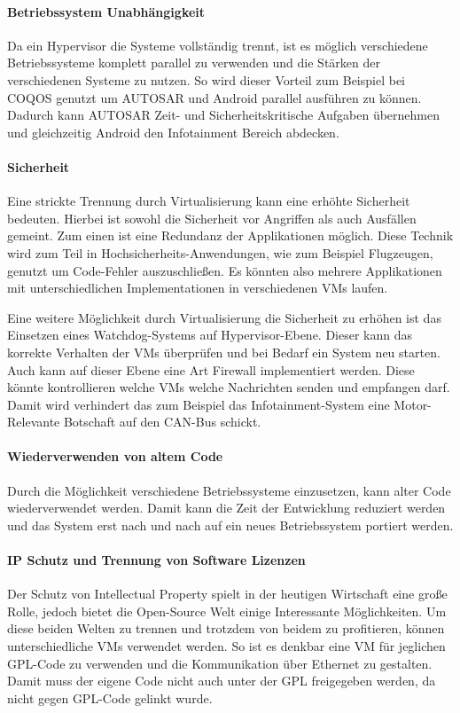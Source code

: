 \documentclass[
  a4paper,					    %
  twoside,
  DIV=calc,     				%
  bibliography=totoc,
  cleardoublepage=empty,
  ngerman,     					%
  final       					%
]{scrbook}
\begin{document}
\paragraph{Betriebssystem Unabhängigkeit}
Da ein Hypervisor die Systeme vollständig trennt, ist es möglich verschiedene Betriebssysteme komplett parallel zu verwenden und die Stärken der verschiedenen Systeme zu nutzen. So wird dieser Vorteil zum Beispiel bei COQOS genutzt um AUTOSAR und Android parallel ausführen zu können. Dadurch kann AUTOSAR Zeit- und Sicherheitskritische Aufgaben übernehmen und gleichzeitig Android den Infotainment Bereich abdecken.

\paragraph{Sicherheit}
Eine strickte Trennung durch Virtualisierung kann eine erhöhte Sicherheit bedeuten. Hierbei ist sowohl die Sicherheit vor Angriffen als auch Ausfällen gemeint. Zum einen ist eine Redundanz der Applikationen möglich. Diese Technik wird zum Teil in Hochsicherheits-Anwendungen, wie zum Beispiel Flugzeugen, genutzt um Code-Fehler auszuschließen. Es könnten also mehrere Applikationen mit unterschiedlichen Implementationen in verschiedenen VMs laufen.

Eine weitere Möglichkeit durch Virtualisierung die Sicherheit zu erhöhen ist das Einsetzen eines Watchdog-Systems auf Hypervisor-Ebene. Dieser kann das korrekte Verhalten der VMs überprüfen und bei Bedarf ein System neu starten. Auch kann auf dieser Ebene eine Art Firewall implementiert werden. Diese könnte kontrollieren welche VMs welche Nachrichten senden und empfangen darf. Damit wird verhindert das zum Beispiel das Infotainment-System eine Motor-Relevante Botschaft auf den CAN-Bus schickt.

\paragraph{Wiederverwenden von altem Code}
Durch die Möglichkeit verschiedene Betriebssysteme einzusetzen, kann alter Code wiederverwendet werden. Damit kann die Zeit der Entwicklung reduziert werden und das System erst nach und nach auf ein neues Betriebssystem portiert werden.

\paragraph{IP Schutz und Trennung von Software Lizenzen}
Der Schutz von Intellectual Property spielt in der heutigen Wirtschaft eine große Rolle, jedoch bietet die Open-Source Welt einige Interessante Möglichkeiten. Um diese beiden Welten zu trennen und trotzdem von beidem zu profitieren, können unterschiedliche VMs verwendet werden. So ist es denkbar eine VM für jeglichen GPL-Code zu verwenden und die Kommunikation über Ethernet zu gestalten. Damit muss der eigene Code nicht auch unter der GPL freigegeben werden, da nicht gegen GPL-Code gelinkt wurde.
\end{document}
